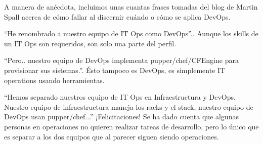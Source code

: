 \documentclass[conference]{IEEEtran}
\begin{document}
A manera de anécdota, incluimos unas cuantas frases tomadas del blog de Martin Spall acerca de cómo fallar al discernir cuándo o cómo se aplica DevOps.

“He renombrado a nuestro equipo de IT Ops como DevOps”.. Aunque los skills de un IT Ops son requeridos, son solo una parte del perfil.

“Pero.. nuestro equipo de DevOps implementa pupper/chef/CFEngine para provisionar sus sistemas.”. Ésto tampoco es DevOps, es simplemente IT operations usando herramientas.

“Hemos separado nuestros equipo de IT Ops en Infraestructura y DevOps. Nuestro equipo de infraestructura maneja los racks y el stack, nuestro equipo de DevOps usan pupper/chef...” ¡Felicitaciones! Se ha dado cuenta que algunas personas en operaciones no quieren realizar tareas de desarrollo, pero lo único que es separar a los dos equipos que al parecer siguen siendo operaciones.

%
%



%
%
\end{document}

